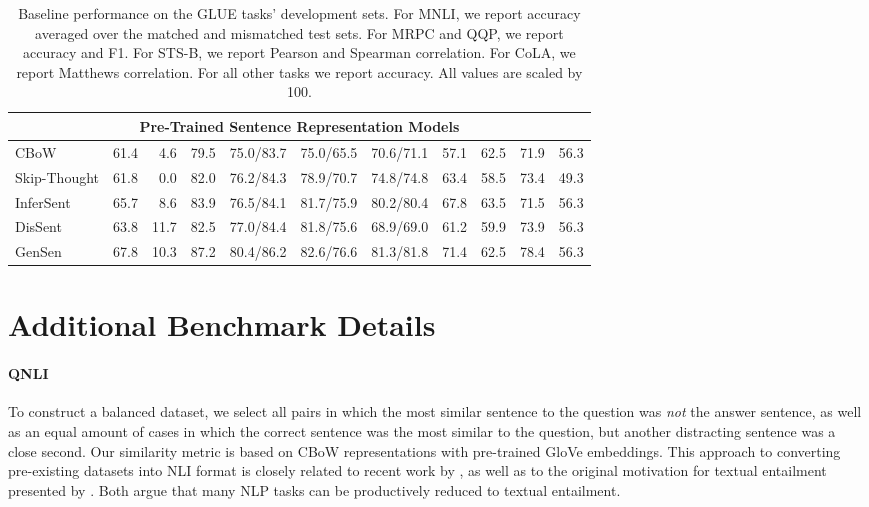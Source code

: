 \documentclass{article} \usepackage{iclr2019_conference,times}
\begin{document}
\begin{table*}[t]
\begin{tabular}{lrrrrrrrrrr}
\midrule
\multicolumn{11}{c}{Pre-Trained Sentence Representation Models} \\
\midrule

 CBoW & 61.4 & 4.6 & 79.5 & 75.0/83.7 & 75.0/65.5 & 70.6/71.1 & 57.1 & 62.5 & 71.9 & 56.3 \\
Skip-Thought & 61.8 & 0.0 & 82.0 & 76.2/84.3 & 78.9/70.7 & 74.8/74.8 & 63.4 & 58.5 & 73.4 & 49.3 \\
InferSent & 65.7 & 8.6 & 83.9 & 76.5/84.1 & 81.7/75.9 & 80.2/80.4 & 67.8 & 63.5 & 71.5 & 56.3 \\
DisSent & 63.8 & 11.7 & 82.5 & 77.0/84.4 & 81.8/75.6 & 68.9/69.0 & 61.2 & 59.9 & 73.9 & 56.3 \\
GenSen & 67.8 & 10.3 & 87.2 & 80.4/86.2 & 82.6/76.6 & 81.3/81.8 & 71.4 & 62.5 & 78.4 & 56.3 \\

\bottomrule
\end{tabular}
\caption{Baseline performance on the GLUE tasks' development sets. 
For MNLI, we report accuracy averaged over the matched and mismatched test sets. For MRPC and QQP, we report accuracy and F1. For STS-B, we report Pearson and Spearman correlation. For CoLA, we report Matthews correlation. For all other tasks we report accuracy. All values are scaled by 100.
}
\label{tab:benchmark-dev}
\end{table*}

\section{Additional Benchmark Details}\label{sec:apdx_data}



\paragraph{QNLI} 
To construct a balanced dataset, we select all pairs in which the most similar sentence to the question was \emph{not} the answer sentence, as well as an equal amount of cases in which the correct sentence was the most similar to the question, but another distracting sentence was a close second. Our similarity metric is based on CBoW representations with pre-trained GloVe embeddings. This approach to converting pre-existing datasets into NLI format is closely related to recent work by \citet{white2017inference}, as well as to the original motivation for textual entailment presented by \citet{dagan2006pascal}. Both argue that many NLP tasks can be productively reduced to textual entailment. 
\end{document}
